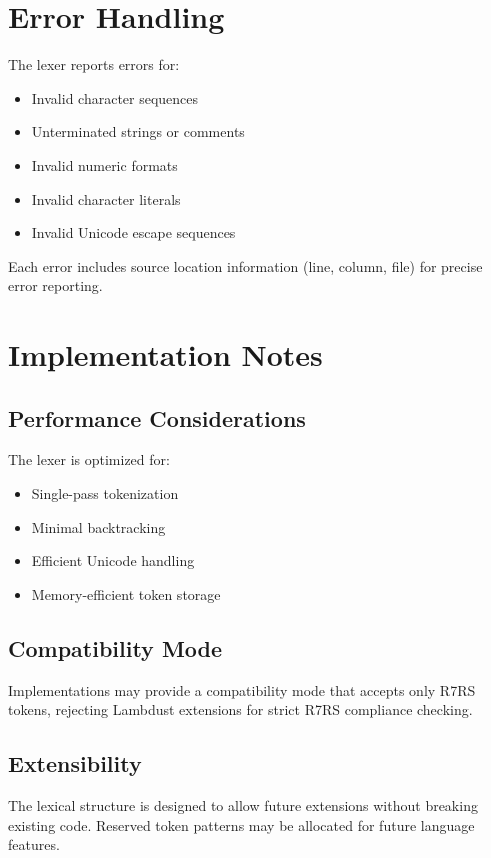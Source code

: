 \section{Error Handling}
\label{sec:lexical-errors}

The lexer reports errors for:

\begin{itemize}
\item Invalid character sequences
\item Unterminated strings or comments
\item Invalid numeric formats
\item Invalid character literals
\item Invalid Unicode escape sequences
\end{itemize}

Each error includes source location information (line, column, file) for precise error reporting.

\section{Implementation Notes}
\label{sec:lexical-implementation}

\subsection{Performance Considerations}
The lexer is optimized for:
\begin{itemize}
\item Single-pass tokenization
\item Minimal backtracking
\item Efficient Unicode handling
\item Memory-efficient token storage
\end{itemize}

\subsection{Compatibility Mode}
Implementations may provide a compatibility mode that accepts only R7RS tokens, rejecting Lambdust extensions for strict R7RS compliance checking.

\subsection{Extensibility}
The lexical structure is designed to allow future extensions without breaking existing code. Reserved token patterns may be allocated for future language features.